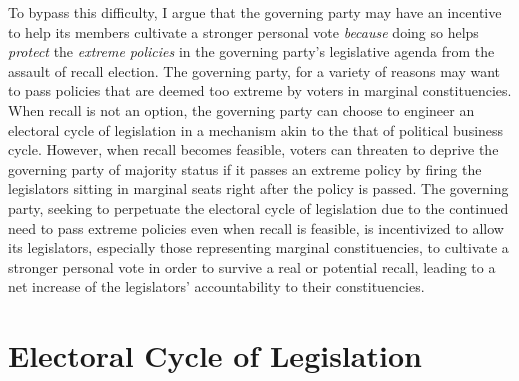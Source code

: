\documentclass{article}
\begin{document}
			
			To bypass this difficulty,
			I argue that the governing party may have an incentive
			to help its members cultivate a stronger personal vote
			\textit{because}
			doing so helps \textit{protect} the
			\textit{extreme policies} in the governing party's legislative agenda
			from the assault of recall election.
			The governing party,
			for a variety of reasons
			may want to pass policies that are deemed too extreme
			by voters in marginal constituencies.
			When recall is not an option,
			the governing party can choose to engineer an electoral cycle of legislation
			in a mechanism
			akin to the that of political business cycle.
			However,
			when recall becomes feasible,
			voters can threaten to deprive the governing party of majority status
			if it passes an extreme policy
			by firing the legislators sitting in marginal seats right
			after the policy is passed.
			The governing party,
			seeking to perpetuate the electoral cycle of legislation
			due to the continued need to pass extreme policies
			even when recall is feasible,
			is incentivized to allow its legislators,
			especially those representing marginal constituencies,
			to cultivate a stronger personal vote
			in order to survive a real or potential recall,
			leading to a net increase of the legislators' accountability
			to their constituencies.
			
						
	\section*{Electoral Cycle of Legislation}
		
\end{document}
